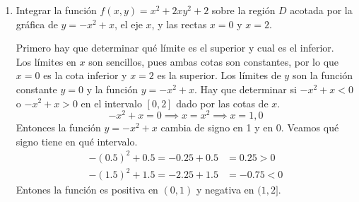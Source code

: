 \documentclass{article}
\begin{document}
\begin{enumerate}
    \pagebreak
    \item {
        Integrar la función $f(x,y) = x^2 + 2xy^2 + 2$ sobre la región $D$
        acotada por la gráfica de $y = -x^2 + x$, el eje $x$, y las rectas
        $x = 0$ y $x = 2$.

        \color{azul}
        Primero hay que determinar qué límite es el superior y cual es el inferior.\\
        Los límites en $x$ son sencillos, pues ambas cotas son constantes, por lo
        que $x = 0$ es la cota inferior y $x = 2$ es la superior.
        Los límites de $y$ son la función constante $y = 0$ y la función
        $y = -x^2 + x$. Hay que determinar si  $-x^2 + x < 0 $ o $-x^2 + x > 0 $
        en el intervalo $[0, 2]$ dado por las cotas de $x$.
        \[-x^2 + x = 0 \implies x = x^2 \implies x = 1, 0\]
        Entonces la función $y = -x^2 + x$ cambia de signo en 1 y en 0. Veamos
        qué signo tiene en qué intervalo.
        \begin{align*}
            -(0.5)^2 + 0.5 = -0.25 + 0.5 & = 0.25 > 0 \\
            -(1.5)^2 + 1.5 = -2.25 + 1.5 & = -0.75 < 0
        \end{align*}
        Entones la función es positiva en $(0, 1)$ y negativa en $(1, 2]$.

}
\end{enumerate}
\end{document}
